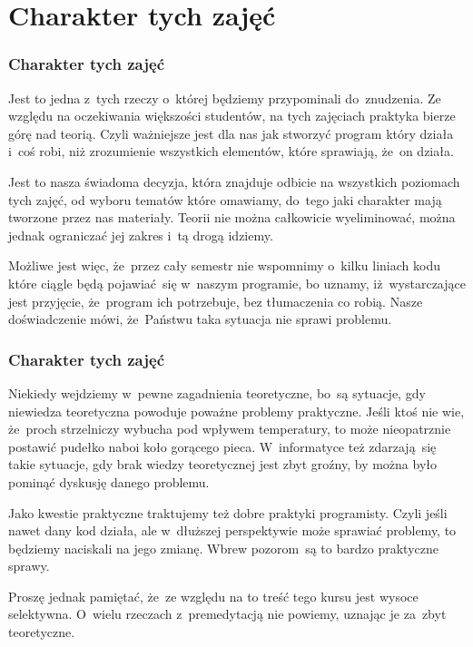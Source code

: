 \documentclass[10pt,t]{beamer}
\begin{document}
\section{Charakter tych zajęć}


\begin{frame}
  \frametitle{Charakter tych zajęć}


  Jest to jedna z~tych rzeczy o~której będziemy przypominali do~znudzenia.
  Ze względu na oczekiwania większości studentów, na tych zajęciach
  \alert{praktyka bierze górę nad teorią}. Czyli ważniejsze jest dla nas jak
  stworzyć program który działa i~coś robi, niż zrozumienie wszystkich
  elementów, które sprawiają, że~on działa.

  Jest to nasza świadoma decyzja, która znajduje odbicie na wszystkich
  poziomach tych zajęć, od wyboru tematów które omawiamy, do~tego jaki
  charakter mają tworzone przez nas materiały. Teorii nie można całkowicie
  wyeliminować, można jednak ograniczać jej zakres i~tą drogą idziemy.

  Możliwe jest więc, że~przez cały semestr nie wspomnimy o~kilku liniach
  kodu które ciągle będą pojawiać~się w~naszym programie, bo uznamy,
  iż~wystarczające jest przyjęcie, że~program ich potrzebuje, bez
  tłumaczenia co robią. Nasze doświadczenie mówi, że~Państwu taka sytuacja
  nie sprawi problemu.

\end{frame}





\begin{frame}
  \frametitle{Charakter tych zajęć}


  Niekiedy wejdziemy w~pewne zagadnienia teoretyczne, bo~są sytuacje, gdy
  niewiedza teoretyczna powoduje poważne problemy praktyczne. Jeśli ktoś
  nie wie, że~proch strzelniczy wybucha pod wpływem temperatury, to może
  nieopatrznie postawić pudełko naboi koło gorącego pieca. W~informatyce
  też zdarzają~się takie sytuacje, gdy brak wiedzy teoretycznej jest zbyt
  groźny, by można było pominąć dyskusję danego problemu.

  Jako kwestie praktyczne traktujemy też dobre praktyki programisty.
  Czyli jeśli nawet dany kod działa, ale w~dłuższej perspektywie może
  sprawiać problemy, to będziemy naciskali na jego zmianę. Wbrew
  pozorom~są to bardzo praktyczne sprawy.

  Proszę jednak pamiętać, że~ze względu na to treść tego kursu jest wysoce
  selektywna. O~wielu rzeczach z~premedytacją nie powiemy, uznając je
  za~zbyt teoretyczne.

\end{frame}
\end{document}
